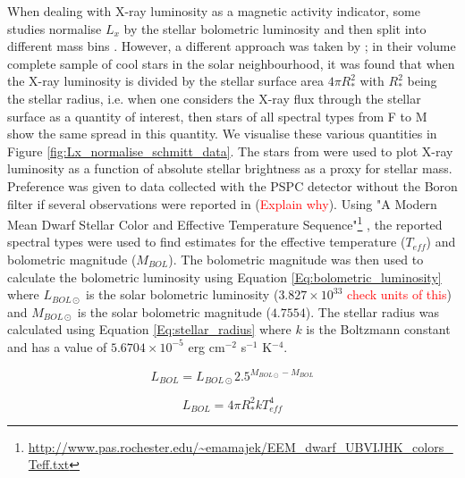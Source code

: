 When dealing with X-ray luminosity as a magnetic activity indicator, some studies normalise $L_{x}$ by the stellar bolometric luminosity and then split into different mass bins \citep{Preibisch_Feigelson_2005,Jackson_etal_2012}. However, a different approach was taken by \citet{Schmitt_Liefke_2004}; in their volume complete sample of cool stars in the solar neighbourhood, it was found that when the X-ray luminosity is divided by the stellar surface area $4\pi R_{*}^{2}$ with $R_{*}^{2}$ being the stellar radius, i.e. when one considers the X-ray flux through the stellar surface as a quantity of interest, then stars of all spectral types from F to M show the same spread in this quantity. We visualise these various quantities in Figure \ref{fig:Lx_normalise_schmitt_data}. The stars from \citet{Schmitt_Liefke_2004} were used to plot X-ray luminosity as a function of absolute stellar brightness as a proxy for stellar mass. Preference was given to data collected with the PSPC detector without the Boron filter if several observations were reported in \citet{Schmitt_Liefke_2004}(\textcolor{red}{Explain why}). Using "A Modern Mean Dwarf Stellar Color and Effective Temperature Sequence"\footnote{\url{http://www.pas.rochester.edu/~emamajek/EEM_dwarf_UBVIJHK_colors_Teff.txt}} \citep{Pecaut_Mamajek_2013}, the reported spectral types \citep{Schmitt_Liefke_2004} were used to find estimates for the effective temperature ($T_{eff}$) and bolometric magnitude ($M_{BOL}$). The bolometric magnitude was then used to calculate the bolometric luminosity using Equation \ref{Eq:bolometric_luminosity} where $L_{BOL\odot}$ is the solar bolometric luminosity ($3.827 \times 10^{33}$ \textcolor{red}{check units of this}) and $M_{BOL\odot}$ is the solar bolometric magnitude ($4.7554$). The stellar radius was calculated using Equation \ref{Eq:stellar_radius} where $k$ is the Boltzmann constant and has a value of $5.6704 \times 10^{-5}$ erg cm$^{-2}$ s$^{-1}$ K$^{-4}$. 

\begin{equation}
    L_{BOL} = L_{BOL\odot} 2.5^{M_{BOL\odot} - M_{BOL}}
    \label{Eq:bolometric_luminosity}
\end{equation}

\begin{equation}
    L_{BOL} = 4\pi R_{*}^{2}kT_{eff}^{4}
    \label{Eq:stellar_radius}
\end{equation}

